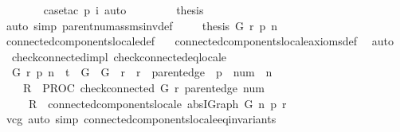 \begin{isabellebody}
\ \ \ \ \ \ \isamarkupfalse%
\ {\isacharparenleft}case{\isacharunderscore}tac\ {\isachardoublequoteopen}p\ i{\isachardoublequoteclose}{\isacharparenright}\ auto\ \isacommand{{\isacharbraceright}}\isamarkupfalse%
\isanewline
\ \ \ \ \isamarkupfalse%
\ \isamarkupfalse%
\ {\isacharquery}thesis\isanewline
\ \ \ \ \ \ \isamarkupfalse%
\ {\isacharparenleft}auto\ simp{\isacharcolon}\ parent{\isacharunderscore}num{\isacharunderscore}assms{\isacharunderscore}inv{\isacharunderscore}def{\isacharparenright}\isanewline
\ \ \isamarkupfalse%
\isanewline
{}\isamarkupfalse%
\isanewline
{}\isamarkupfalse%
\ \ {\isachardoublequoteopen}{\isacharquery}thesis\ G\ r\ p\ n{\isachardoublequoteclose}\isanewline
\ \ \isamarkupfalse%
\ connected{\isacharunderscore}components{\isacharunderscore}locale{\isacharunderscore}def\ \isanewline
\ \ connected{\isacharunderscore}components{\isacharunderscore}locale{\isacharunderscore}axioms{\isacharunderscore}def\ \isamarkupfalse%
\ auto\isanewline
{}\isamarkupfalse%
%
\endisatagproof
{\isafoldproof}%
%
\isadelimproof
\isanewline
%
\endisadelimproof
\isanewline
{}\isamarkupfalse%
\ {\isacharparenleft}\ check{\isacharunderscore}connected{\isacharunderscore}impl{\isacharparenright}\ check{\isacharunderscore}connected{\isacharunderscore}eq{\isacharunderscore}locale{\isacharcolon}\isanewline
\ \ {\isachardoublequoteopen}{\isasymforall}G\ r\ p\ n{\isachardot}\ {\isasymGamma}\ {\isasymturnstile}\isactrlsub t\ {\isasymlbrace}\ {\isasymacute}G\ {\isacharequal}\ G\ {\isasymand}\ {\isasymacute}r\ {\isacharequal}\ r\ {\isasymand}\ {\isasymacute}parent{\isacharunderscore}edge\ {\isacharequal}\ p\ {\isasymand}\ {\isasymacute}num\ {\isacharequal}\ n\ {\isasymrbrace}\isanewline
\ \ \ \ {\isasymacute}R\ {\isacharcolon}{\isacharequal}{\isacharequal}\ PROC\ check{\isacharunderscore}connected\ {\isacharparenleft}{\isasymacute}G{\isacharcomma}\ {\isasymacute}r{\isacharcomma}\ {\isasymacute}parent{\isacharunderscore}edge{\isacharcomma}\ {\isasymacute}num{\isacharparenright}\isanewline
\ \ \ \ {\isasymlbrace}\ {\isasymacute}R\ {\isacharequal}\ connected{\isacharunderscore}components{\isacharunderscore}locale\ {\isacharparenleft}abs{\isacharunderscore}IGraph\ G{\isacharparenright}\ n\ p\ r{\isasymrbrace}{\isachardoublequoteclose}\isanewline
%
\isadelimproof
%
\endisadelimproof
%
\isatagproof
{}\isamarkupfalse%
\ vcg\ {\isacharparenleft}auto\ simp{\isacharcolon}\ connected{\isacharunderscore}components{\isacharunderscore}locale{\isacharunderscore}eq{\isacharunderscore}invariants{\isacharparenright}%

\end{isabellebody}
